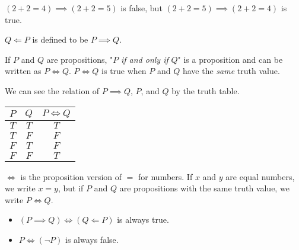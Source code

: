 \documentclass[a4paper]{article}
\begin{document}
\begin{eg}
$(2 + 2 = 4) \implies (2 + 2 = 5)$ is false, but $(2 + 2 = 5) \implies (2 + 2 = 4)$ is true.
\end{eg}

\begin{notation}
$Q \Longleftarrow P$ is defined to be $P \implies Q$.
\end{notation}

\begin{defi}
If $P$ and $Q$ are propositions, "$P$ \emph{if and only if} $Q$" is a proposition and can be written as $P \iff Q$. $P \iff Q$ is true when $P$ and $Q$ have the \emph{same} truth value.
\end{defi}

We can see the relation of $P \implies Q$, $P$, and $Q$ by the truth table.

\begin{center}
	\begin{tabular}{|c|c|c|}
		\hline
		$P$ & $Q$ & $P \iff Q$\\
		\hline
		$T$ & $T$ & $T$\\
		\hline
		$T$ & $F$ & $F$\\
		\hline
		$F$ & $T$ & $F$\\
		\hline
		$F$ & $F$ & $T$\\
		\hline
	\end{tabular}
\end{center}

$\iff$ is the proposition version of $=$ for numbers. If $x$ and $y$ are equal numbers, we write $x = y$, but if $P$ and $Q$ are propositions with the same truth value, we write $P \iff Q$.

\begin{eg}\leavevmode
	\begin{itemize}
		\item $(P \implies Q) \iff (Q \Longleftarrow P)$ is always true.
		\item $P \iff (\neg P)$ is always false.
	\end{itemize}
\end{eg}
\end{document}
